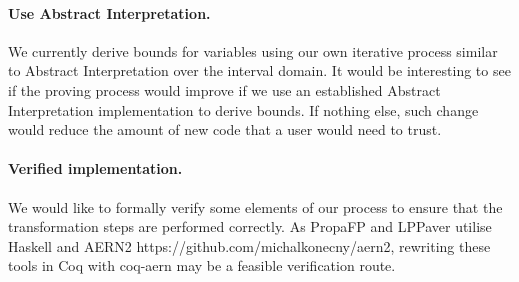 \documentclass[runningheads]{llncs}
\begin{document}
\paragraph*{Use Abstract Interpretation.}
We currently derive bounds for variables using our own iterative process similar to Abstract Interpretation over the interval domain.
It would be interesting to see if the proving process would improve if we use an established Abstract Interpretation implementation to derive bounds.
If nothing else, such change would reduce the amount of new code that a user would need to trust.



\paragraph*{Verified implementation.}

We would like to formally verify some elements of our process to ensure that the transformation steps are performed correctly.
As PropaFP and LPPaver utilise Haskell and AERN2 https://github.com/michalkonecny/aern2, rewriting these tools in Coq with coq-aern \cite{konecny_axiomatic_2021} may be a feasible verification route.


%
%


\end{document}
